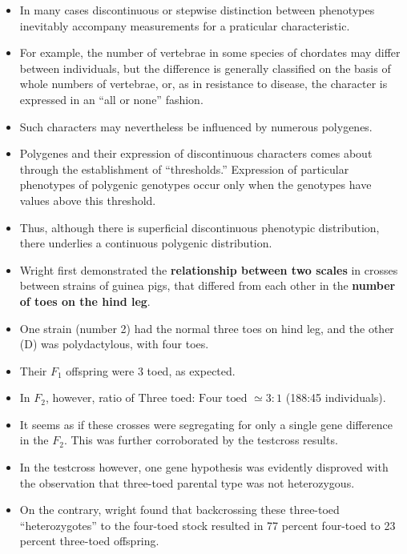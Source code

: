 \documentclass[11pt,dvipsnames,ignorenonframetext,aspectratio=169]{beamer}
\providecommand{\tightlist}{%
  \setlength{\itemsep}{0pt}\setlength{\parskip}{0pt}}
\begin{document}
\begin{frame}{}
\protect\hypertarget{section-11}{}
\begin{itemize}
\tightlist
\item
  In many cases discontinuous or stepwise distinction between phenotypes
  inevitably accompany measurements for a praticular characteristic.
\item
  For example, the number of vertebrae in some species of chordates may
  differ between individuals, but the difference is generally classified
  on the basis of whole numbers of vertebrae, or, as in resistance to
  disease, the character is expressed in an ``all or none'' fashion.
\item
  Such characters may nevertheless be influenced by numerous polygenes.
\end{itemize}
\end{frame}

\begin{frame}{}
\protect\hypertarget{section-12}{}
\begin{itemize}
\tightlist
\item
  Polygenes and their expression of discontinuous characters comes about
  through the establishment of ``thresholds.'' Expression of particular
  phenotypes of polygenic genotypes occur only when the genotypes have
  values above this threshold.
\item
  Thus, although there is superficial discontinuous phenotypic
  distribution, there underlies a continuous polygenic distribution.
\item
  Wright first demonstrated the \textbf{relationship between two scales}
  in crosses between strains of guinea pigs, that differed from each
  other in the \textbf{number of toes on the hind leg}.
\end{itemize}
\end{frame}

\begin{frame}{}
\protect\hypertarget{section-13}{}
\begin{itemize}
\tightlist
\item
  One strain (number 2) had the normal three toes on hind leg, and the
  other (D) was polydactylous, with four toes.
\item
  Their \(F_1\) offspring were 3 toed, as expected.
\item
  In \(F_2\), however, ratio of
  \(\text{Three toed: Four toed } \simeq 3:1\) (188:45 individuals).
\item
  It seems as if these crosses were segregating for only a single gene
  difference in the \(F_2\). This was further corroborated by the
  testcross results.
\item
  In the testcross however, one gene hypothesis was evidently disproved
  with the observation that three-toed parental type was not
  heterozygous.
\item
  On the contrary, wright found that backcrossing these three-toed
  ``heterozygotes'' to the four-toed stock resulted in 77 percent
  four-toed to 23 percent three-toed offspring.
\end{itemize}
\end{frame}
\end{document}
